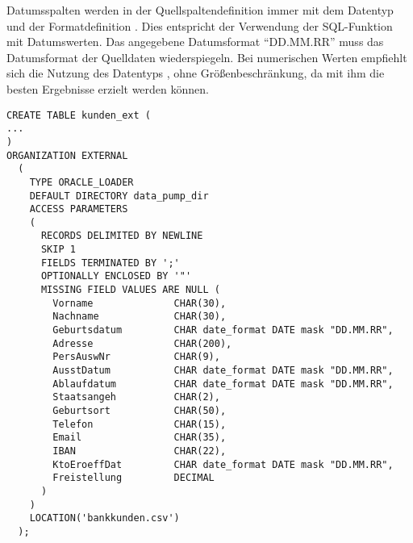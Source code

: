           Datumsspalten werden in der Quellspaltendefinition immer mit dem Datentyp  und der Formatdefinition . Dies entspricht der Verwendung der SQL-Funktion  mit Datumswerten. Das angegebene Datumsformat \enquote{DD.MM.RR} muss das Datumsformat der Quelldaten wiederspiegeln.
\clearpage
          Bei numerischen Werten empfiehlt sich die Nutzung des Datentyps , ohne Größenbeschränkung, da mit ihm die besten Ergebnisse erzielt werden können.
          \begin{lstlisting}[caption={Festlegen der Access parameter},label=admin928a,language=oracle_sql]
CREATE TABLE kunden_ext (
...
)
ORGANIZATION EXTERNAL
  (
    TYPE ORACLE_LOADER
    DEFAULT DIRECTORY data_pump_dir
    ACCESS PARAMETERS
    (
      RECORDS DELIMITED BY NEWLINE
      SKIP 1
      FIELDS TERMINATED BY ';'
      OPTIONALLY ENCLOSED BY '"'
      MISSING FIELD VALUES ARE NULL (
        Vorname              CHAR(30),
        Nachname             CHAR(30),
        Geburtsdatum         CHAR date_format DATE mask "DD.MM.RR",
        Adresse              CHAR(200),
        PersAuswNr           CHAR(9),
        AusstDatum           CHAR date_format DATE mask "DD.MM.RR",
        Ablaufdatum          CHAR date_format DATE mask "DD.MM.RR",
        Staatsangeh          CHAR(2),
        Geburtsort           CHAR(50),
        Telefon              CHAR(15),
        Email                CHAR(35),
        IBAN                 CHAR(22),
        KtoEroeffDat         CHAR date_format DATE mask "DD.MM.RR",
        Freistellung         DECIMAL
      )
    )
    LOCATION('bankkunden.csv')
  );
          \end{lstlisting}

